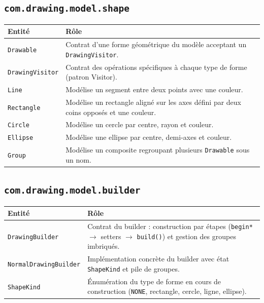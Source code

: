 \documentclass[11pt,a4paper]{article}
\begin{document}
\subsection{\protect\texttt{com.drawing.model.shape}}

\begin{tabular}{|>{\raggedright\arraybackslash}p{}|p{}|}
\hline
\textbf{Entité} & \textbf{Rôle} \\
\hline
\texttt{Drawable} & Contrat d'une forme géométrique du modèle acceptant un \texttt{DrawingVisitor}. \\
\hline
\texttt{DrawingVisitor} & Contrat des opérations spécifiques à chaque type de forme (patron Visitor). \\
\hline
\texttt{Line} & Modélise un segment entre deux points avec une couleur. \\
\hline
\texttt{Rectangle} & Modélise un rectangle aligné sur les axes défini par deux coins opposés et une couleur. \\
\hline
\texttt{Circle} & Modélise un cercle par centre, rayon et couleur. \\
\hline
\texttt{Ellipse} & Modélise une ellipse par centre, demi-axes et couleur. \\
\hline
\texttt{Group} & Modélise un composite regroupant plusieurs \texttt{Drawable} sous un nom. \\
\hline
\end{tabular}

\subsection{\protect\texttt{com.drawing.model.builder}}

\begin{tabular}{|>{\raggedright\arraybackslash}p{}|p{}|}
\hline
\textbf{Entité} & \textbf{Rôle} \\
\hline
\texttt{DrawingBuilder} & Contrat du builder : construction par étapes (\texttt{begin*} $\rightarrow$ setters $\rightarrow$ \texttt{build()}) et gestion des groupes imbriqués. \\
\hline
\texttt{NormalDrawingBuilder} & Implémentation concrète du builder avec état \texttt{ShapeKind} et pile de groupes. \\
\hline
\texttt{ShapeKind} & Énumération du type de forme en cours de construction (\texttt{NONE}, rectangle, cercle, ligne, ellipse). \\
\hline
\end{tabular}
\end{document}
